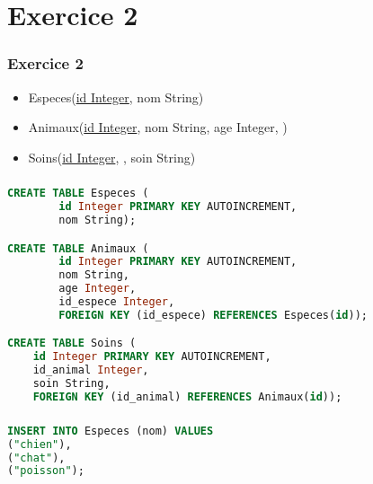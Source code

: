\documentclass[svgnames,11pt]{beamer}
\begin{document}
\section{Exercice 2}
\begin{frame}
    \frametitle{Exercice 2}

    \begin{itemize}
        \item Especes(\underline{id Integer}, nom String)
        \item Animaux(\underline{id Integer}, nom String, age Integer, )
        \item Soins(\underline{id Integer}, , soin String)
    \end{itemize}

\end{frame}
\begin{frame}[fragile]
    \frametitle{}

    \begin{center}
    \begin{lstlisting}[language=SQL , basicstyle=\ttfamily\small, xleftmargin=.5em, xrightmargin=0em]
CREATE TABLE Especes (
        id Integer PRIMARY KEY AUTOINCREMENT, 
        nom String);

CREATE TABLE Animaux (
        id Integer PRIMARY KEY AUTOINCREMENT, 
        nom String, 
        age Integer, 
        id_espece Integer, 
        FOREIGN KEY (id_espece) REFERENCES Especes(id));

CREATE TABLE Soins (
    id Integer PRIMARY KEY AUTOINCREMENT, 
    id_animal Integer, 
    soin String,
    FOREIGN KEY (id_animal) REFERENCES Animaux(id));
\end{lstlisting}
    \label{CODE}
    \end{center}

\end{frame}
\begin{frame}[fragile]
    \frametitle{}

\begin{center}
\begin{lstlisting}[language=SQL , basicstyle=\ttfamily\small, xleftmargin=1em, xrightmargin=0em]
INSERT INTO Especes (nom) VALUES 
("chien"),
("chat"),
("poisson");
\end{lstlisting}
\label{CODE}
\end{center}

\end{frame}
\end{document}
